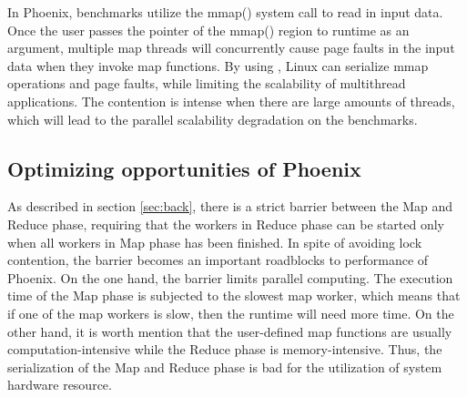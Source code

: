 In Phoenix, benchmarks utilize the mmap() system call to read in input data. 
Once the user passes the pointer of the mmap() region to runtime as an argument, multiple map threads will concurrently cause page faults in the input data when they invoke map functions.
By using , Linux can serialize mmap operations and page faults, while limiting the scalability of multithread applications.
The contention is intense when there are large amounts of threads,
which will lead to the parallel scalability degradation on the benchmarks.
 




\subsection{Optimizing opportunities of Phoenix}
As described in section \ref{sec:back}, there is a strict barrier between the Map and Reduce phase, requiring that the workers in Reduce phase can be started only when all workers in Map phase has been finished.
In spite of avoiding lock contention, the barrier becomes an important roadblocks to  performance of Phoenix. 
On the one hand, the barrier limits parallel computing.
The execution time of the Map phase is subjected to the slowest map worker, which means that if one of the map workers is slow, then the runtime will need more time.
On the other hand, it is worth mention that the user-defined map functions are usually computation-intensive while the Reduce phase is memory-intensive. Thus, the serialization of the Map and Reduce phase is bad for the utilization of system hardware resource.

